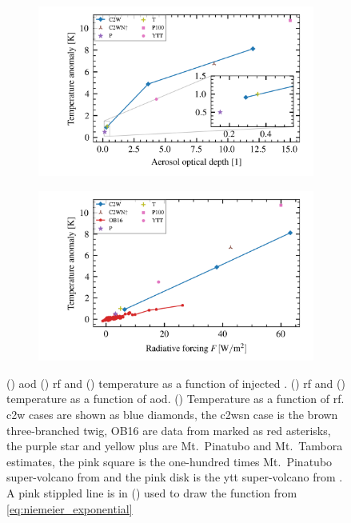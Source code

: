 \documentclass{ametsocV5}
\newcommand{\iso}[1][i]{{#1}njected \ce{SO2}}
\begin{document}
\begin{figure}
  \begin{subfigure}{0.5\linewidth}
    \centering
    \includegraphics[width=0.95\linewidth]{figures/aod_vs_temperature.png}
    \caption{}%
    \label{fig:aod_vs_temp}
  \end{subfigure}
  \begin{subfigure}{0.5\linewidth}
    \centering
    \includegraphics[width=0.95\linewidth]{figures/toa_vs_temperature.png}
    \caption{}%
    \label{fig:toa_vs_temp}
  \end{subfigure}

  \caption{() \ac{aod} () \ac{rf} and
    () temperature as a function of \iso{}\@.
    () \ac{rf} and () temperature as a
    function of \ac{aod}. () Temperature as a function of \ac{rf}.
    \ac{c2w} cases are shown as blue diamonds, the \ac{c2wsn} case is the brown
    three-branched twig, OB16 are data from \citet{ottobliesner2016} marked as red
    asterisks, the purple star and yellow plus are Mt.\ Pinatubo and Mt.\ Tambora estimates,
    the pink square is the one-hundred times Mt.\ Pinatubo super-volcano from
    \citet{jones2005} and the pink disk is the \ac{ytt} super-volcano from
    \citet{timmreck2010}. A pink stippled line is in () used to draw
    the function from \cref{eq:niemeier_exponential}}\label{fig:so2_vs}%
\end{figure}
\end{document}
